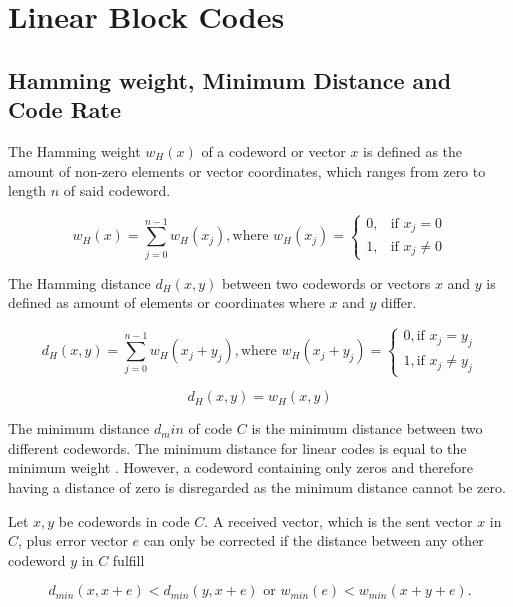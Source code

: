 \documentclass[../main.tex]{subfiles}
\begin{document}
    \chapter{Linear Block Codes}

    \section{Hamming weight, Minimum Distance and Code Rate}
    The Hamming weight $w_H(x)$ of a codeword or vector $x$ is defined as the amount of non-zero elements or vector coordinates, which ranges from zero to length $n$ of said codeword.

    \begin{equation*}
        w_H(x) = \sum_{j=0}^{n-1} w_H(x_j), \text{where } w_H(x_j) = \begin{cases} 0, &\text{if } x_j = 0 \\ 1, &\text{if } x_j \neq 0 \end{cases}
    \end{equation*}

    \noindent
    The Hamming distance $d_H(x,y)$ between two codewords or vectors $x$ and $y$ is defined as amount of elements or coordinates where $x$ and $y$ differ.

    \begin{equation*}
        d_H(x,y) = \sum_{j=0}^{n-1} w_H(x_j+y_j), \text{where } w_H(x_j+y_j) = \begin{cases} 0, \text{if } x_j=y_j \\ 1, \text{if } x_j \neq y_j \end{cases}
    \end{equation*}

    \begin{equation*}
        d_H(x,y) =  w_H(x,y)
    \end{equation*}

    \noindent
    The minimum distance $d_min$ of code $C$ is the minimum distance between two different codewords. The minimum distance for linear codes is equal to the minimum weight \autocite{bossert1999channel}. However, a codeword containing only zeros and therefore having a distance of zero is disregarded as the minimum distance cannot be zero.


    Let $x,y$ be codewords in code $C$. A received vector, which is the sent vector $x$ in $C$, plus error vector $e$ can only be corrected if the distance between any other codeword $y$ in $C$ fulfill

    \begin{equation*}
        d_{min}(x, x+e) < d_{min}(y, x+e) \text{ or } w_{min}(e) < w_{min}(x+y+e).
    \end{equation*}
\end{document}
